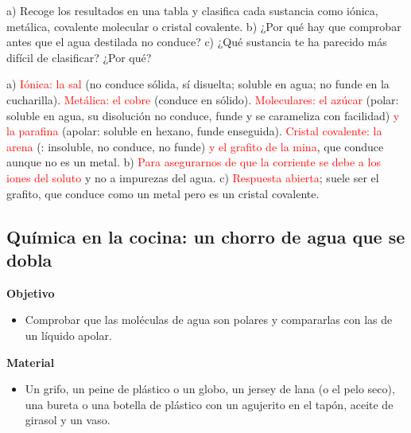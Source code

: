\begin{exercise}
    a) Recoge los resultados en una tabla y clasifica cada sustancia como iónica, metálica, covalente molecular o cristal
    covalente. b) ¿Por qué hay que comprobar antes que el agua destilada no conduce? c) ¿Qué sustancia te ha parecido más difícil
    de clasificar? ¿Por qué?
    \begin{solu}
        a) \textcolor{red}{Iónica: la sal} (no conduce sólida, sí disuelta; soluble en agua; no funde en la cucharilla).
        \textcolor{red}{Metálica: el cobre} (conduce en sólido). \textcolor{red}{Moleculares: el azúcar} (polar: soluble en agua,
        su disolución no conduce, funde y se carameliza con facilidad) \textcolor{red}{y la parafina} (apolar: soluble en hexano,
        funde enseguida). \textcolor{red}{Cristal covalente: la arena} (: insoluble, no conduce, no funde) \textcolor{red}{y
        el grafito de la mina}, que conduce aunque no es un metal. b) \textcolor{red}{Para asegurarnos de que la corriente se debe a
        los iones del soluto} y no a impurezas del agua. c) \textcolor{red}{Respuesta abierta}; suele ser el grafito, que conduce
        como un metal pero es un cristal covalente.
    \end{solu}
\end{exercise}

\subsection{Química en la cocina: un chorro de agua que se dobla}

\noindent\begin{minipage}[t]{0.48\textwidth}
    \textbf{Objetivo}
    \begin{itemize}
        \item Comprobar que las moléculas de agua son polares y compararlas con las de un líquido apolar.
    \end{itemize}
\end{minipage}\hfill
\begin{minipage}[t]{0.48\textwidth}
    \textbf{Material}
    \begin{itemize}
        \item Un grifo, un peine de plástico o un globo, un jersey de lana (o el pelo seco), una bureta o una botella de plástico con
        un agujerito en el tapón, aceite de girasol y un vaso.
    \end{itemize}
\end{minipage}


